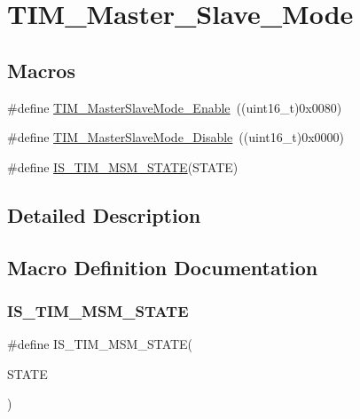 \hypertarget{group___t_i_m___master___slave___mode}{}\section{T\+I\+M\+\_\+\+Master\+\_\+\+Slave\+\_\+\+Mode}
\label{group___t_i_m___master___slave___mode}
\subsection*{Macros}
\begin{DoxyCompactItemize}
\item 
\#define \mbox{\hyperlink{group___t_i_m___master___slave___mode_gaef5da910ae6952fce424b440ea39f69a}{T\+I\+M\+\_\+\+Master\+Slave\+Mode\+\_\+\+Enable}}~((uint16\+\_\+t)0x0080)
\item 
\#define \mbox{\hyperlink{group___t_i_m___master___slave___mode_ga8d4c7c0f57469f384b1327bb323d28a3}{T\+I\+M\+\_\+\+Master\+Slave\+Mode\+\_\+\+Disable}}~((uint16\+\_\+t)0x0000)
\item 
\#define \mbox{\hyperlink{group___t_i_m___master___slave___mode_ga53146701cf287a0eca43b9232dffac60}{I\+S\+\_\+\+T\+I\+M\+\_\+\+M\+S\+M\+\_\+\+S\+T\+A\+TE}}(S\+T\+A\+TE)
\end{DoxyCompactItemize}


\subsection{Detailed Description}


\subsection{Macro Definition Documentation}
\mbox{\label{group___t_i_m___master___slave___mode_ga53146701cf287a0eca43b9232dffac60}} 
\subsubsection{\texorpdfstring{IS\_TIM\_MSM\_STATE}{IS\_TIM\_MSM\_STATE}}
{\footnotesize\ttfamily \#define I\+S\+\_\+\+T\+I\+M\+\_\+\+M\+S\+M\+\_\+\+S\+T\+A\+TE(\begin{DoxyParamCaption}\item[{}]{S\+T\+A\+TE }\end{DoxyParamCaption})}

